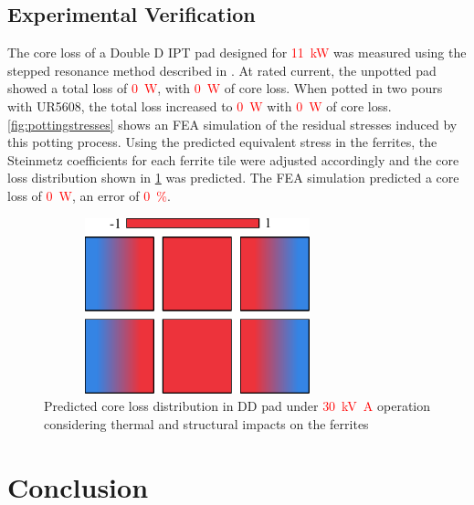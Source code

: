 \documentclass[conference]{IEEEtran}
\begin{document}
\subsection{Experimental Verification}

The core loss of a Double D IPT pad designed for \textcolor{red}{\SI{11}{\kilo\watt}} was measured using the stepped resonance method described in \cite{kalraPowerLossMeasurement2020}.
At rated current, the unpotted pad showed a total loss of \textcolor{red}{\SI{0}{\watt}}, with \textcolor{red}{\SI{0}{\watt}} of core loss.
When potted in two pours with UR5608, the total loss increased to \textcolor{red}{\SI{0}{\watt}} with \textcolor{red}{\SI{0}{\watt}} of core loss. 
\cref{fig:pottingstresses} shows an FEA simulation of the residual stresses induced by this potting process. 
Using the predicted equivalent stress in the ferrites, the Steinmetz coefficients for each ferrite tile were adjusted accordingly and the core loss distribution shown in \cref{fig:padcoreloss} was predicted. 
The FEA simulation predicted a core loss of \textcolor{red}{\SI{0}{\watt}}, an error of \textcolor{red}{\SI{0}{\percent}}. 

\begin{figure}[t]
  \includegraphics[width=3.5in, height=2in]{figures/simulatedpottingpadstresses.pdf}
  \caption{Predicted core loss distribution in DD pad under \textcolor{red}{\SI{30}{\kilo\volt\ampere}} operation considering thermal and structural impacts on the ferrites}
  \label{fig:padcoreloss}
\end{figure}

\section{Conclusion}
\end{document}
